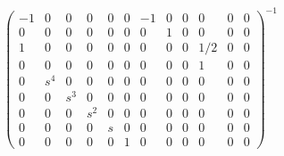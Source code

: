 \documentclass[a4paper,12pt]{article}
\begin{document}
\begin{landscape}
$$\begin{pmatrix}
		-1&    0&    0&    0& 0& 0& -1& 0&      0&   0& 0& 0\\
		0&    0&    0&    0& 0& 0&  0& 1&      0&   0& 0& 0\\
		1&    0&    0&    0& 0& 0&  0& 0&      0& 1/2& 0& 0\\
		0&    0&    0&    0& 0& 0&  0& 0&      0&   1& 0& 0\\
		0& s^4&   0&   0&0&0& 0&0&     0&  0&0&0\\
		0&    0& s^3&   0&0&0& 0&0&     0&  0&0&0\\
		0&    0&    0& s^2&0&0& 0&0&     0&  0&0&0\\
		0&    0&    0&    0& s& 0&  0& 0&      0&   0& 0& 0\\
		0&    0&    0&    0& 0& 1&  0& 0&      0&   0& 0& 0
		\end{pmatrix}^{-1}$$  
\end{landscape}
\end{document}
